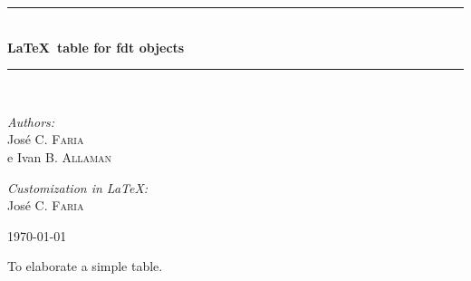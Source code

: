 \documentclass[10pt,a4paper]{article}
\newcommand{\HRule}{\rule{\linewidth}{0.5mm}}
\begin{document}
\begin{titlepage}
  \begin{center}

    \HRule \\[0.4cm]
    {\huge \bfseries \LaTeX~table for fdt objects} \\[0.4cm]

    \HRule \\[1.5cm]

    \begin{minipage}{0.5\textwidth}
      \begin{flushleft} \large
        \emph{Authors:}\\
        José C. \textsc{Faria} \\
        e Ivan B. \textsc{Allaman}
      \end{flushleft}
    \end{minipage}
    \begin{minipage}{0.4\textwidth}
      \begin{flushright} \large
        \emph{Customization in \LaTeX:} \\
        José C. \textsc{Faria}
      \end{flushright}
    \end{minipage}

    \vfill

    {\large \today}

  \end{center}
\end{titlepage}
\vspace{3cm}

\newpage

To elaborate a simple table.
\end{document}
